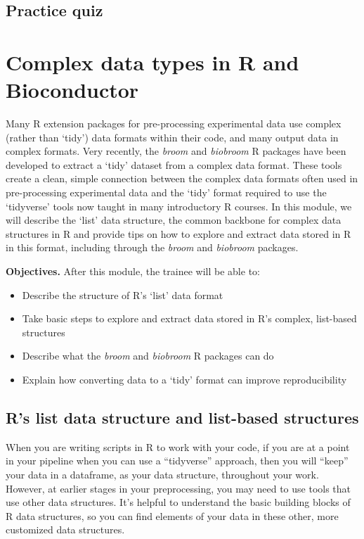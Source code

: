 \documentclass[]{tufte-book}
\providecommand{\tightlist}{%
  \setlength{\itemsep}{0pt}\setlength{\parskip}{0pt}}
\begin{document}
\hypertarget{practice-quiz-3}{%
\subsection{Practice quiz}\label{practice-quiz-3}}

\hypertarget{module16}{%
\section{Complex data types in R and Bioconductor}\label{module16}}

Many R extension packages for pre-processing experimental data use complex
(rather than `tidy') data formats within their code, and many output data in
complex formats. Very recently, the \emph{broom} and \emph{biobroom} R
packages have been developed to extract a `tidy' dataset from a complex data
format. These tools create a clean, simple connection between the complex data
formats often used in pre-processing experimental data and the `tidy' format
required to use the `tidyverse' tools now taught in many introductory R courses.
In this module, we will describe the `list' data structure, the common backbone
for complex data structures in R and provide tips on how to explore and extract
data stored in R in this format, including through the \emph{broom} and
\emph{biobroom} packages.

\textbf{Objectives.} After this module, the trainee will be able to:

\begin{itemize}
\tightlist
\item
  Describe the structure of R's `list' data format
\item
  Take basic steps to explore and extract data stored in R's complex, list-based
  structures
\item
  Describe what the \emph{broom} and \emph{biobroom} R packages can do
\item
  Explain how converting data to a `tidy' format can improve reproducibility
\end{itemize}

\hypertarget{rs-list-data-structure-and-list-based-structures}{%
\subsection{R's list data structure and list-based structures}\label{rs-list-data-structure-and-list-based-structures}}

When you are writing scripts in R to work with your code, if you are at a
point in your pipeline when you can use a ``tidyverse'' approach, then you will
``keep'' your data in a dataframe, as your data structure, throughout your
work. However, at earlier stages in your preprocessing, you may need to use
tools that use other data structures. It's helpful to understand the
basic building blocks of R data structures, so you can find elements of your
data in these other, more customized data structures.
\end{document}
